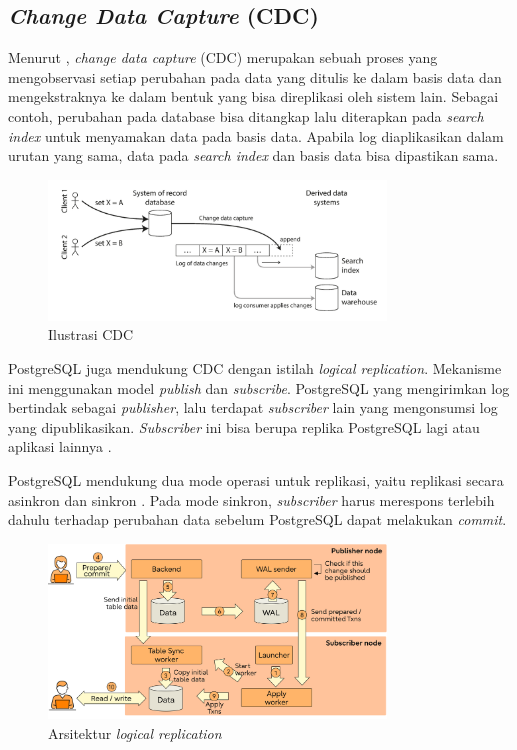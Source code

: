 \subsection{\textit{Change Data Capture} (CDC)}

Menurut \cite{dataIntensiveApplications}, \textit{change data capture} (CDC) merupakan sebuah proses yang mengobservasi setiap perubahan pada data yang ditulis ke dalam basis data dan mengekstraknya ke dalam bentuk yang bisa direplikasi oleh sistem lain. Sebagai contoh, perubahan pada database bisa ditangkap lalu diterapkan pada \textit{search index} untuk menyamakan data pada basis data. Apabila log diaplikasikan dalam urutan yang sama, data pada \textit{search index} dan basis data bisa dipastikan sama.

\begin{figure}[ht]
    \centering
    \includegraphics[width=0.8\textwidth]{resources/chapter-2/cdc.png}
    \caption{Ilustrasi CDC \parencite{dataIntensiveApplications}}
    \label{fig:cdc-illustration}
\end{figure}

PostgreSQL juga mendukung CDC dengan istilah \textit{logical replication}. Mekanisme ini menggunakan model \textit{publish} dan \textit{subscribe}. PostgreSQL yang mengirimkan log bertindak sebagai \textit{publisher}, lalu terdapat \textit{subscriber} lain yang mengonsumsi log yang dipublikasikan. \textit{Subscriber} ini bisa berupa replika PostgreSQL lagi atau aplikasi lainnya \parencite{pgLogicalReplication}.

PostgreSQL mendukung dua mode operasi untuk replikasi, yaitu replikasi secara asinkron dan sinkron \parencite{insideLogicalReplication}. Pada mode sinkron, \textit{subscriber} harus merespons terlebih dahulu terhadap perubahan data sebelum PostgreSQL dapat melakukan \textit{commit}.

\begin{figure}[ht]
    \centering
    \includegraphics[width=0.8\textwidth]{resources/chapter-2/postgres-logical-replication.png}
    \caption{Arsitektur \textit{logical replication} \parencite{insideLogicalReplication}}
    \label{fig:logical-replication-architecture}
\end{figure}

